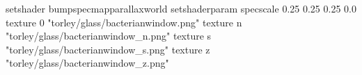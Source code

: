 setshader bumpspecmapparallaxworld
setshaderparam specscale 0.25 0.25 0.25 0.0
texture 0 "torley/glass/bacterianwindow.png"
texture n "torley/glass/bacterianwindow_n.png"
texture s "torley/glass/bacterianwindow_s.png"
texture z "torley/glass/bacterianwindow_z.png"

